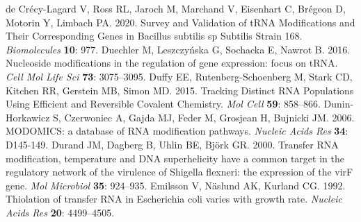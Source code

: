 \documentclass[times, twoside]{zHenriquesLab-StyleBioRxiv}
\begin{document}
\newline
\newline
de Crécy-Lagard V, Ross RL, Jaroch M, Marchand V, Eisenhart C, Brégeon D, Motorin Y, Limbach PA. 2020. Survey and Validation of tRNA Modifications and Their Corresponding Genes in Bacillus subtilis sp Subtilis Strain 168. \textit{Biomolecules} \textbf{10}: 977. 
\newline
\newline
Duechler M, Leszczyńska G, Sochacka E, Nawrot B. 2016. Nucleoside modifications in the regulation of gene expression: focus on tRNA. \textit{Cell Mol Life Sci} \textbf{73}: 3075–3095. 
\newline
\newline
Duffy EE, Rutenberg-Schoenberg M, Stark CD, Kitchen RR, Gerstein MB, Simon MD. 2015. Tracking Distinct RNA Populations Using Efficient and Reversible Covalent Chemistry. \textit{Mol Cell} \textbf{59}: 858–866. 
\newline
\newline
Dunin-Horkawicz S, Czerwoniec A, Gajda MJ, Feder M, Grosjean H, Bujnicki JM. 2006. MODOMICS: a database of RNA modification pathways. \textit{Nucleic Acids Res} \textbf{34}: D145-149. 
\newline
\newline
Durand JM, Dagberg B, Uhlin BE, Björk GR. 2000. Transfer RNA modification, temperature and DNA superhelicity have a common target in the regulatory network of the virulence of Shigella flexneri: the expression of the virF gene. \textit{Mol Microbiol} \textbf{35}: 924–935. 
\newline
\newline
Emilsson V, Näslund AK, Kurland CG. 1992. Thiolation of transfer RNA in Escherichia coli varies with growth rate. \textit{Nucleic Acids Res} \textbf{20}: 4499–4505. 
\end{document}
